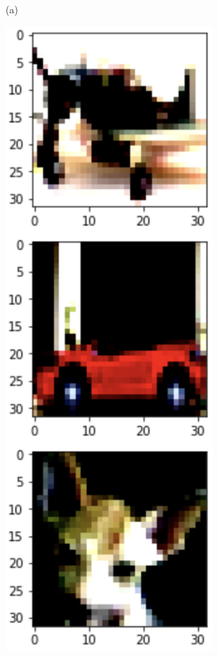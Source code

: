 \begin{figure}[ht]
\begin{minipage}{.25\columnwidth}
        (a)
    \end{minipage}
    \begin{minipage}{.25\columnwidth}
        \centering
        \includegraphics[width=0.7\textwidth]{figures/2.png} \\

\end{minipage}
\end{figure}
